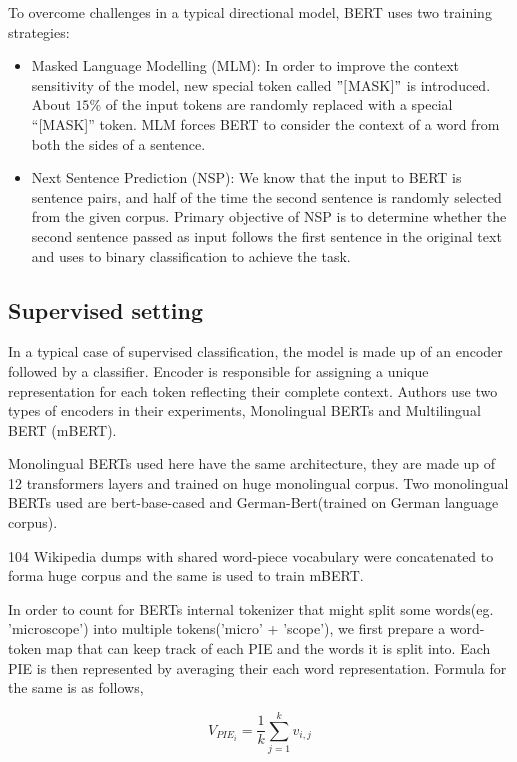 \documentclass[11pt,a4paper]{article}
\begin{document}
To overcome challenges in a typical directional model, BERT uses two training strategies:

\begin{itemize}
  \item Masked Language Modelling (MLM): In order to improve the context sensitivity of the model, new special token called $"[$MASK$]"$ is introduced. About $15\%$ of the input tokens are randomly
  replaced with a special “[MASK]” token. MLM forces BERT to consider the context of a word from both the sides of a sentence.

  \item Next Sentence Prediction (NSP): We know that the input to BERT is sentence pairs, and half of the time the second sentence is randomly selected from the given corpus. Primary objective of NSP is to determine whether the second sentence passed as input follows the first sentence in the original text and uses to binary classification to achieve the task. 
\end{itemize}

\subsection{Supervised setting}
In a typical case of supervised classification, the model is made up of an encoder followed by a classifier. Encoder is responsible for assigning a unique representation for each token reflecting their complete context. Authors use two types of encoders in their experiments, Monolingual BERTs and Multilingual BERT (mBERT).

Monolingual BERTs used here have the same architecture,  they are made up of 12 transformers layers and trained on huge monolingual corpus. Two monolingual BERTs used are bert-base-cased and German-Bert(trained on German language corpus).

104 Wikipedia dumps with shared word-piece vocabulary were concatenated to forma huge corpus and the same is used to train mBERT. 

In order to count for BERTs internal tokenizer that might split some words(eg. 'microscope') into multiple tokens('micro' + 'scope'), we first prepare a word-token map that can keep track of each PIE and the words it is split into. Each PIE is then represented by averaging their each word representation. Formula for the same is as follows,

\begin{equation}
  \label{equ:1}
  V_{PIE_{i}} = \frac{1}{k}\sum_{j=1}^{k} v_{i,j}
\end{equation}
\end{document}
